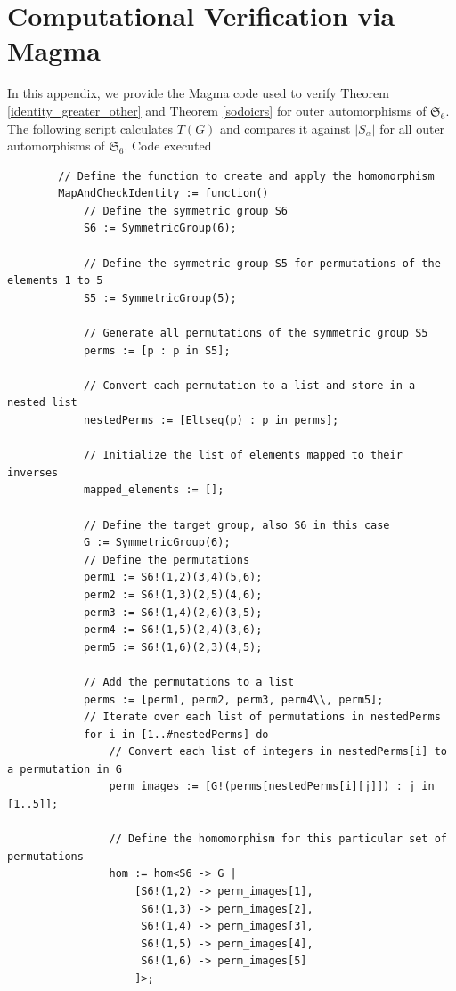 \documentclass[oneside]{amsart}
\theoremstyle{plain}
\theoremstyle{definition}
\theoremstyle{remark}
\begin{document}
\section{Computational Verification via Magma}
\label{appendix:magma}

    In this appendix, we provide the Magma \cite{MR1484478} code used to verify Theorem \ref{identity_greater_other} and Theorem \ref{sodoicrs} for outer automorphisms of $\mathfrak{S}_6$. The following script calculates $T(G)$ and compares it against $|S_\alpha|$ for all outer automorphisms of $\mathfrak{S}_6$.
    Code executed
    \noindent
    \begin{verbatim}
        // Define the function to create and apply the homomorphism
        MapAndCheckIdentity := function()
            // Define the symmetric group S6
            S6 := SymmetricGroup(6);
        
            // Define the symmetric group S5 for permutations of the elements 1 to 5
            S5 := SymmetricGroup(5);
        
            // Generate all permutations of the symmetric group S5
            perms := [p : p in S5];
        
            // Convert each permutation to a list and store in a nested list
            nestedPerms := [Eltseq(p) : p in perms];
        
            // Initialize the list of elements mapped to their inverses
            mapped_elements := [];
            
            // Define the target group, also S6 in this case
            G := SymmetricGroup(6);
            // Define the permutations
            perm1 := S6!(1,2)(3,4)(5,6);
            perm2 := S6!(1,3)(2,5)(4,6);
            perm3 := S6!(1,4)(2,6)(3,5);
            perm4 := S6!(1,5)(2,4)(3,6);
            perm5 := S6!(1,6)(2,3)(4,5);
        
            // Add the permutations to a list
            perms := [perm1, perm2, perm3, perm4\\, perm5];
            // Iterate over each list of permutations in nestedPerms
            for i in [1..#nestedPerms] do
                // Convert each list of integers in nestedPerms[i] to a permutation in G
                perm_images := [G!(perms[nestedPerms[i][j]]) : j in [1..5]];
        
                // Define the homomorphism for this particular set of permutations
                hom := hom<S6 -> G | 
                    [S6!(1,2) -> perm_images[1],  
                     S6!(1,3) -> perm_images[2],  
                     S6!(1,4) -> perm_images[3],  
                     S6!(1,5) -> perm_images[4],  
                     S6!(1,6) -> perm_images[5]
                    ]>;
        

\end{verbatim}
\end{document}
